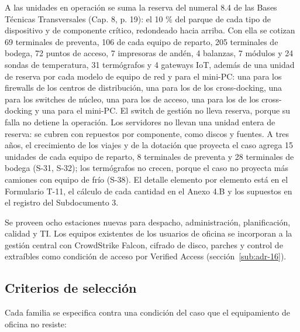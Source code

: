 A las unidades en operación se suma la reserva del numeral 8.4 de las Bases Técnicas Transversales (Cap. 8, p. 19): el 10 \% del parque de cada tipo de dispositivo y de componente crítico, redondeado hacia arriba. Con ella se cotizan 69 terminales de preventa, 106 de cada equipo de reparto, 205 terminales de bodega, 72 puntos de acceso, 7 impresoras de andén, 4 balanzas, 7 módulos y 24 sondas de temperatura, 31 termógrafos y 4 gateways IoT, además de una unidad de reserva por cada modelo de equipo de red y para el mini-PC: una para los firewalls de los centros de distribución, una para los de los cross-docking, una para los switches de núcleo, una para los de acceso, una para los de los cross-docking y una para el mini-PC. El switch de gestión no lleva reserva, porque su falla no detiene la operación. Los servidores no llevan una unidad entera de reserva: se cubren con repuestos por componente, como discos y fuentes. A tres años, el crecimiento de los viajes y de la dotación que proyecta el caso agrega 15 unidades de cada equipo de reparto, 8 terminales de preventa y 28 terminales de bodega (S-31, S-32); los termógrafos no crecen, porque el caso no proyecta más camiones con equipo de frío (S-38). El detalle elemento por elemento está en el Formulario T-11, el cálculo de cada cantidad en el Anexo 4.B y los supuestos en el registro del Subdocumento 3.

Se proveen ocho estaciones nuevas para despacho, administración, planificación, calidad y TI. Los equipos existentes de los usuarios de oficina se incorporan a la gestión central con CrowdStrike Falcon, cifrado de disco, parches y control de extraíbles como condición de acceso por Verified Access (sección~\ref{sub:adr-16}).

\subsection{Criterios de selección}

Cada familia se especifica contra una condición del caso que el equipamiento de oficina no resiste:

